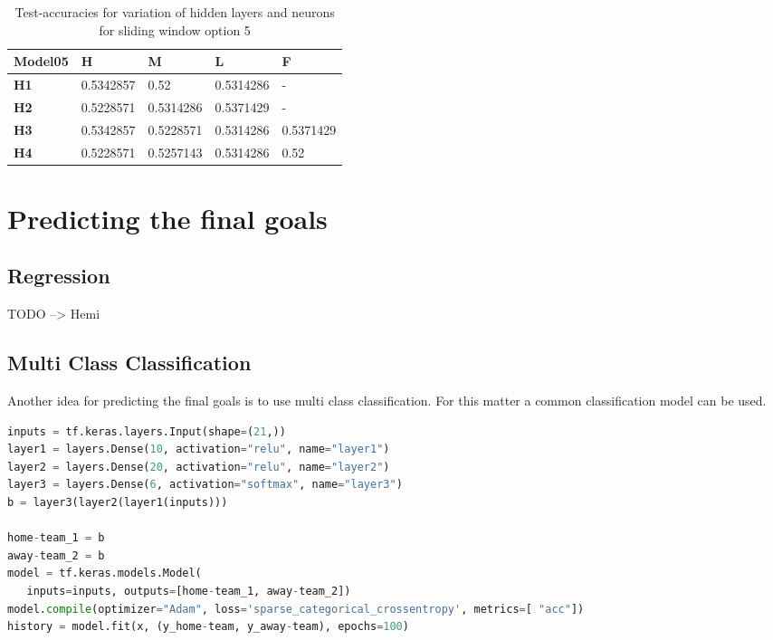 \begin{table}
\centering
\begin{tabular}{|l|l|l|l|l|}
\hline

\textbf{Model05} & \textbf{H} & \textbf{M} & \textbf{L} & \textbf{F} \\ \hline
\textbf{H1} & 0.5342857 & 0.52 & 0.5314286 & - \\ \hline
\textbf{H2} & 0.5228571 & 0.5314286 & 0.5371429 & - \\ \hline
\textbf{H3} & 0.5342857 & 0.5228571 & 0.5314286 & 0.5371429 \\ \hline
\textbf{H4} & 0.5228571 & 0.5257143 & 0.5314286 & 0.52 \\ \hline

\end{tabular}
\caption{Test-accuracies for variation of hidden layers and neurons for sliding window option 5}
\label{table:nn_variation_sliding_05}
\end{table}

\section{Predicting the final goals}
\subsection{Regression}
TODO --> Hemi
\subsection{Multi Class Classification}
Another idea for predicting the final goals is to use multi class classification. For this matter a common classification model can be used. 

\begin{lstlisting}[language=Python, caption=Python code for multi class classification, label=modelmcc]
inputs = tf.keras.layers.Input(shape=(21,))
layer1 = layers.Dense(10, activation="relu", name="layer1")
layer2 = layers.Dense(20, activation="relu", name="layer2")
layer3 = layers.Dense(6, activation="softmax", name="layer3")
b = layer3(layer2(layer1(inputs)))

home-team_1 = b
away-team_2 = b
model = tf.keras.models.Model(
   inputs=inputs, outputs=[home-team_1, away-team_2])
model.compile(optimizer="Adam", loss='sparse_categorical_crossentropy', metrics=[ "acc"])
history = model.fit(x, (y_home-team, y_away-team), epochs=100)
\end{lstlisting}

